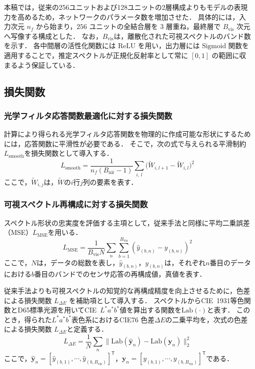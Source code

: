 \documentclass[MIRU,submit]{miru2026j}
\begin{document}
本稿では，従来\cite{proc:higashi}の256ユニットおよび128ユニットの2層構成よりもモデルの表現力を高めるため，ネットワークのパラメータ数を増加させた．
具体的には，入力次元 $n_f$ から始まり，$256$ ユニットの全結合層を $3$ 層重ね，最終層で $B_{\mathrm{vis}}$ 次元へ写像する構成とした．
なお，$B_{\mathrm{vis}}$は，離散化された可視スペクトルのバンド数を示す．
各中間層の活性化関数には $\mathrm{ReLU}$ を用い，出力層には $\mathrm{Sigmoid}$ 関数を適用することで，推定スペクトルが正規化反射率として常に $[0,1]$ の範囲に収まるよう保証している．

\subsection{損失関数}
\subsubsection{光学フィルタ応答関数最適化に対する損失関数}\label{subsec:filter_loss}
計算により得られる光学フィルタ応答関数を物理的に作成可能な形状にするためには，応答関数に平滑性が必要である．
そこで，次の式で与えられる平滑制約$L_{\mathrm{smooth}}$を損失関数として導入する．
\begin{equation}
L_{\mathrm{smooth}} = \frac{1}{n_f (B_{\mathrm{nir}}-1)} \sum_{i, \, l} \bigl(\tilde{W}_{i, l+1} - \tilde{W}_{i, l} \bigr)^2 \label{eq:loss_filter}
\end{equation}
ここで，$\tilde{W}_{i, j}$は，$\tilde{W}$の$i$行$j$列の要素を表す．

\subsubsection{可視スペクトル再構成に対する損失関数}
スペクトル形状の忠実度を評価する主項として，従来手法\cite{proc:higashi}と同様に平均二乗誤差（MSE）$L_{\mathrm{MSE}}$を用いる．
\begin{equation}
L_{\mathrm{MSE}} = \frac{1}{B_{\mathrm{vis}}N} \sum_{n}\sum_{b=1}^{B_{\mathrm{vis}}} (\hat{y}_{(b, n)} - y_{(b, n)})^2 \label{eq:loss_mse}
\end{equation}
ここで，$N$は，データの総数を表し，$\hat{y}_{(b, n)}$，$y_{(b, n)}$は，それぞれ$n$番目のデータにおける$b$番目のバンドでのセンサ応答の再構成値，真値を表す．

従来手法\cite{proc:higashi}よりも可視スペクトルの知覚的な再構成精度を向上させるために，色差による損失関数 $L_{\Delta E}$ を補助項として導入する．
スペクトルからCIE~1931等色関数とD65標準光源を用いてCIE~$L^*a^*b^*$値を算出する関数を$\mathrm{Lab}(\cdot)$と表す．
このとき，得られた$L^*a^*b^*$表色系におけるCIE76 色差$\Delta E$の二乗平均を，次式の色差による損失関数 $L_{\Delta E}$と定義する．
\begin{equation}
L_{\Delta E} = \frac{1}{N} \sum_{n} \bigl\| \mathrm{Lab}(\hat{\bm{y}}_n) - \mathrm{Lab}(\bm{y}_n) \bigr\|_2^2 \label{eq:loss_deltae}
\end{equation}
ここで，$\hat{\bm{y}}_n = [\hat{y}_{(b, 1)}, \cdots, \hat{y}_{(b, B_{\mathrm{vis}})}]^\mathsf{T}$，$\bm{y}_n = [y_{(b, 1)}, \cdots, y_{(b, B_{\mathrm{vis}})}]^\mathsf{T}$である．
\end{document}
